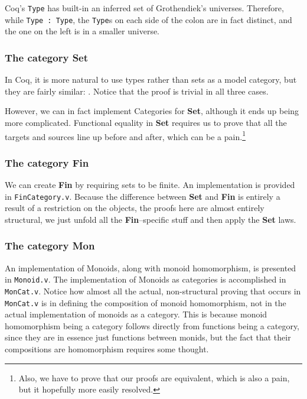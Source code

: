 \documentclass[12pt,twocolumn,oneside]{book}
\begin{document}
Coq's \texttt{Type} has built-in an inferred set of Grothendiek's universes. Therefore,
while \texttt{Type : Type}, the \texttt{Type}s on each side of the colon are in fact
distinct, and the one on the left is in a smaller universe.

\subsubsection{The category \textbf{Set}}

In Coq, it is more natural to use types rather than sets as a model category, but
they are fairly similar: . Notice that the proof
is trivial in all three cases.

However, we can in fact implement Categories for \textbf{Set}, although it ends
up being more complicated. Functional equality in \textbf{Set} requires us to prove
that all the targets and sources line up before and after, which can be a pain.\footnote{
Also, we have to prove that our proofs are equivalent, which is also a pain, but
it hopefully more easily resolved.}

\subsubsection{The category \textbf{Fin}}

We can create \textbf{Fin} by requiring sets to be finite. An implementation is
provided in \texttt{FinCategory.v}. Because the difference between \textbf{Set}
and \textbf{Fin} is entirely a result of a restriction on the objects, the proofs
here are almost entirely structural, we just unfold all the \textbf{Fin}--specific
stuff and then apply the \textbf{Set} laws.

\subsubsection{The category \textbf{Mon}}

An implementation of Monoids, along with monoid homomorphism, is presented in
\texttt{Monoid.v}. The implementation of Monoids as categories is accomplished
in \texttt{MonCat.v}. Notice how almost all the actual, non-structural proving
that occurs in \texttt{MonCat.v} is in defining the composition of monoid
homomorphism, not in the actual implementation of monoids as a category. This is
because monoid homomorphism being a category follows directly from functions being
a category, since they are in essence just functions between monids, but the fact
that their compositions are homomorphism requires some thought.
\end{document}
